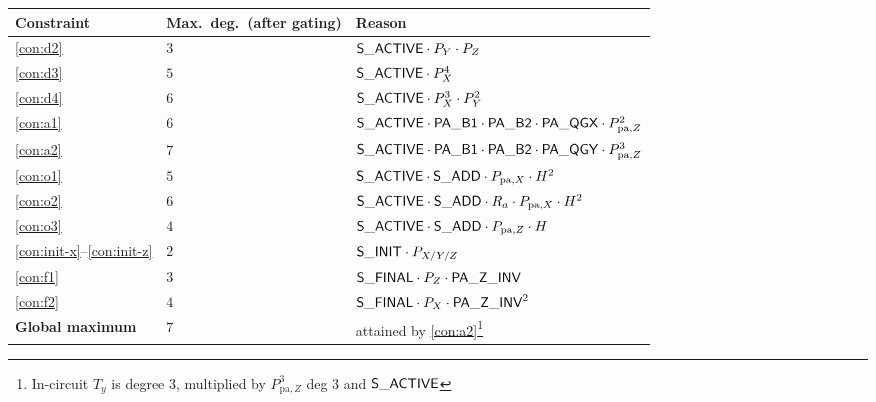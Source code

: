 \begin{center}
\small
\begin{tabular}{lll}
\toprule
\textbf{Constraint} & \textbf{Max.\ deg.\ (after gating)} & \textbf{Reason} \\
\midrule
\ref{con:d2}     & $3$ & $\mathsf{S\_ACTIVE} \cdot P_Y \cdot P_Z$ \\
\ref{con:d3}     & $5$ & $\mathsf{S\_ACTIVE} \cdot P_X^4$ \\
\ref{con:d4}     & $6$ & $\mathsf{S\_ACTIVE} \cdot P_X^3 \cdot P_Y^2$ \\
\ref{con:a1}     & $6$ & $\mathsf{S\_ACTIVE} \cdot \mathsf{PA\_B1} \cdot \mathsf{PA\_B2} \cdot \mathsf{PA\_QGX} \cdot P_{\mathrm{pa},Z}^2$ \\
\ref{con:a2}     & $7$ & $\mathsf{S\_ACTIVE} \cdot \mathsf{PA\_B1} \cdot \mathsf{PA\_B2} \cdot \mathsf{PA\_QGY} \cdot P_{\mathrm{pa},Z}^3$ \\
\ref{con:o1}     & $5$ & $\mathsf{S\_ACTIVE} \cdot \mathsf{S\_ADD} \cdot P_{\mathrm{pa},X} \cdot H^2$ \\
\ref{con:o2}     & $6$ & $\mathsf{S\_ACTIVE} \cdot \mathsf{S\_ADD} \cdot R_a \cdot P_{\mathrm{pa},X} \cdot H^2$ \\
\ref{con:o3}     & $4$ & $\mathsf{S\_ACTIVE} \cdot \mathsf{S\_ADD} \cdot P_{\mathrm{pa},Z} \cdot H$ \\
\ref{con:init-x}--\ref{con:init-z} & $2$ & $\mathsf{S\_INIT} \cdot P_{X/Y/Z}$ \\
\ref{con:f1}     & $3$ & $\mathsf{S\_FINAL} \cdot P_Z \cdot \mathsf{PA\_Z\_INV}$ \\
\ref{con:f2}     & $4$ & $\mathsf{S\_FINAL} \cdot P_X \cdot \mathsf{PA\_Z\_INV}^2$ \\
\midrule
\textbf{Global maximum} & \textbf{$7$} & attained by \ref{con:a2}\footnote{In-circuit $T_y$ is degree $3$, multiplied by $P_{\mathrm{pa},Z}^3$ deg $3$ and $\mathsf{S\_ACTIVE}$} \\
\bottomrule
\end{tabular}
\end{center}
